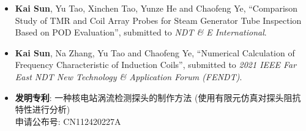 \begin{itemize}
    \item \textbf{Kai Sun}, Yu Tao, Xinchen Tao, Yunze He and Chaofeng Ye,
          ``Comparison Study of TMR and Coil Array Probes for Steam Generator Tube Inspection Based on POD Evaluation'',
          submitted to \emph{NDT \& E International}.\\
          { \footnotesize {}}
    \item \textbf{Kai Sun}, Na Zhang, Yu Tao and Chaofeng Ye,
          ``Numerical Calculation of Frequency Characteristic of Induction Coils'',
          submitted to \emph{2021 IEEE Far East NDT New Technology \& Application Forum (FENDT)}.\\
          { \footnotesize {}}
    \item \textbf{发明专利}: 一种核电站涡流检测探头的制作方法 (使用有限元仿真对探头阻抗特性进行分析) \\
          申请公布号: CN112420227A
\end{itemize}